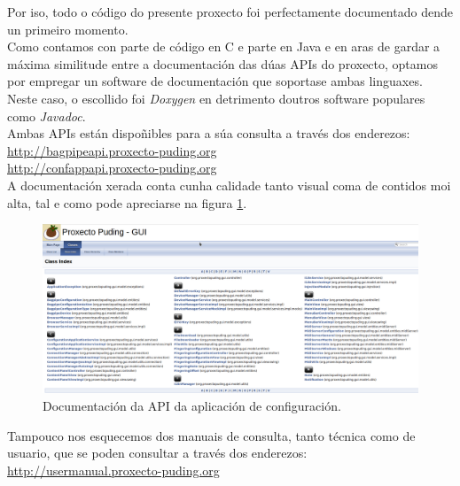  Por iso, todo o código do presente proxecto foi perfectamente documentado dende
 un primeiro momento. \\
 
 Como contamos con parte de código en C e parte en Java e en aras de gardar a
 máxima similitude entre a documentación das dúas APIs do proxecto, optamos por
 empregar un software de documentación que soportase ambas linguaxes. Neste
 caso, o escollido foi \textit{Doxygen} \cite{Doxygen} en detrimento doutros
 software populares como \textit{Javadoc}. \\
 
 Ambas APIs están dispoñibles para a súa consulta a través dos enderezos: \\
 
 \url{http://bagpipeapi.proxecto-puding.org} \\
 
 \url{http://confappapi.proxecto-puding.org} \\
 
 A documentación xerada conta cunha calidade tanto visual coma de contidos moi
 alta, tal e como pode apreciarse na figura \ref{figura:ConAppApi}. \\
 
 \begin{figure}[htbp]
  \centering
  \includegraphics[scale=0.4,angle=90,keepaspectratio=true]{./imagenes/confapp-api.png}
  \caption{Documentación da API da aplicación de configuración.}
  \label{figura:ConAppApi}
 \end{figure}
 
 Tampouco nos esquecemos dos manuais de consulta, tanto técnica como de usuario,
 que se poden consultar a través dos enderezos: \\

 \url{http://usermanual.proxecto-puding.org} \\
 
